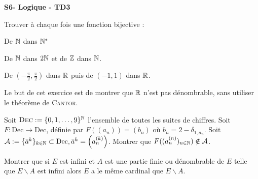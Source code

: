 \documentclass[french]{report}
\begin{document}
\begin{center}
    \huge{\textbf{S6- Logique - TD3}}
\end{center}

\begin{exo}
    Trouver à chaque fois une fonction bijective :
    \begin{q}{1}
        De \(\mathbb{N}\) dans \(\mathbb{N}^*\)
    \end{q}
    \begin{q}{2}
        De \(\mathbb{N}\) dans \(2\mathbb{N}\) et de \(\mathbb{Z}\) dans \(\mathbb{N}\).
    \end{q}
    \begin{q}{3}
        De \((-\frac\pi2,\frac\pi2)\) dans \(\mathbb{R}\) puis de \((-1,1)\) dans \(\mathbb{R}\).
    \end{q}
\end{exo}

\begin{exo}
    Le but de cet exercice est de montrer que \(\mathbb{R}\) n'est pas dénombrable, sans utiliser
    le théorème de \textsc{Cantor}.
    \begin{q}{1}
        Soit \(\textsc{Dec}:=\{0,1,\dots,9\}^{\mathbb{N}}\) l'ensemble de toutes les suites
        de chiffres. Soit \(F:\textrm{Dec}\to\text{Dec}\), définie par \(F((a_n))=(b_n)\)
        où \(b_n = 2 - \delta_{1,a_n}\).
        Soit \(\mathcal{A}:=\{\bar{a}^k\}_{k\in\mathbb{N}}\subset\text{Dec},\bar{a}^k=
        \left(a^{(k)}_n\right)\). Montrer que \(F((a^{(n)}_n)_{n\in\mathbb{N}})\notin\mathcal{A}\).
    \end{q}
\end{exo}

\begin{exo}
    Montrer que si \(E\) est infini et \(A\) est une partie finie ou dénombrable de \(E\)
    telle que \(E\backslash A\) est infini alors \(E\) a le même cardinal
    que \(E\backslash A\).
\end{exo}
\end{document}
